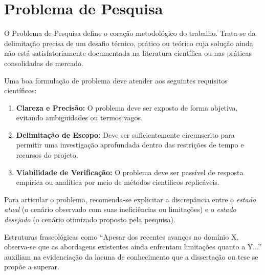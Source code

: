 \section{Problema de Pesquisa}
\label{problema}

O Problema de Pesquisa define o coração metodológico do trabalho. Trata-se da delimitação precisa de um desafio técnico, prático ou teórico cuja solução ainda não está satisfatoriamente documentada na literatura científica ou nas práticas consolidadas de mercado.

Uma boa formulação de problema deve atender aos seguintes requisitos científicos:
\begin{enumerate}
    \item \textbf{Clareza e Precisão:} O problema deve ser exposto de forma objetiva, evitando ambiguidades ou termos vagos.
    \item \textbf{Delimitação de Escopo:} Deve ser suficientemente circunscrito para permitir uma investigação aprofundada dentro das restrições de tempo e recursos do projeto.
    \item \textbf{Viabilidade de Verificação:} O problema deve ser passível de resposta empírica ou analítica por meio de métodos científicos replicáveis.
\end{enumerate}

Para articular o problema, recomenda-se explicitar a discrepância entre o \textit{estado atual} (o cenário observado com suas ineficiências ou limitações) e o \textit{estado desejado} (o cenário otimizado proposto pela pesquisa). 

Estruturas fraseológicas como \enquote{Apesar dos recentes avanços no domínio X, observa-se que as abordagens existentes ainda enfrentam limitações quanto a Y...} auxiliam na evidenciação da lacuna de conhecimento que a dissertação ou tese se propõe a superar.